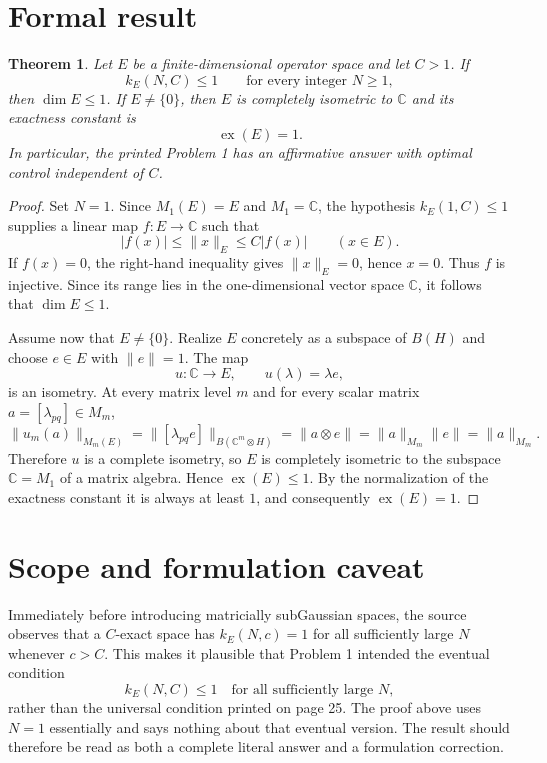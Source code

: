 \documentclass[11pt]{article}
\newtheorem{theorem}{Theorem}
\newcommand{\M}{M}
\newcommand{\C}{\mathbb C}
\begin{document}
\section{Formal result}

\begin{theorem}
Let $E$ be a finite-dimensional operator space and let $C>1$. If
\[
 k_E(N,C)\leq 1\qquad\text{for every integer }N\geq 1,
\]
then $\dim E\leq 1$. If $E\neq\{0\}$, then $E$ is completely isometric to
$\C$ and its exactness constant is
\[
 \operatorname{ex}(E)=1.
\]
In particular, the printed Problem 1 has an affirmative answer with optimal
control independent of $C$.
\end{theorem}

\begin{proof}
Set $N=1$. Since $\M_1(E)=E$ and $\M_1=\C$, the hypothesis
$k_E(1,C)\leq 1$ supplies a linear map $f:E\to\C$ such that
\[
 |f(x)|\leq \|x\|_E\leq C|f(x)| \qquad (x\in E).
\]
If $f(x)=0$, the right-hand inequality gives $\|x\|_E=0$, hence $x=0$.
Thus $f$ is injective. Since its range lies in the one-dimensional vector
space $\C$, it follows that $\dim E\leq 1$.

Assume now that $E\neq\{0\}$. Realize $E$ concretely as a subspace of
$B(H)$ and choose $e\in E$ with $\|e\|=1$. The map
\[
 u:\C\longrightarrow E,\qquad u(\lambda)=\lambda e,
\]
is an isometry. At every matrix level $m$ and for every scalar matrix
$a=[\lambda_{pq}]\in\M_m$,
\[
 \|u_m(a)\|_{\M_m(E)}
 =\|[\lambda_{pq}e]\|_{B(\C^m\otimes H)}
 =\|a\otimes e\|
 =\|a\|_{\M_m}\|e\|
 =\|a\|_{\M_m}.
\]
Therefore $u$ is a complete isometry, so $E$ is completely isometric to the
subspace $\C=\M_1$ of a matrix algebra. Hence $\operatorname{ex}(E)\leq 1$.
By the normalization of the exactness constant it is always at least $1$,
and consequently $\operatorname{ex}(E)=1$.
\end{proof}

\section{Scope and formulation caveat}

Immediately before introducing matricially subGaussian spaces, the source
observes that a $C$-exact space has $k_E(N,c)=1$ for all sufficiently large
$N$ whenever $c>C$. This makes it plausible that Problem 1 intended the
eventual condition
\[
 k_E(N,C)\leq 1\quad\text{for all sufficiently large }N,
\]
rather than the universal condition printed on page 25. The proof above uses
$N=1$ essentially and says nothing about that eventual version. The result
should therefore be read as both a complete literal answer and a formulation
correction.
\end{document}
